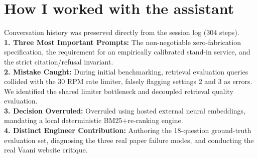 \documentclass[9pt]{article}
\begin{document}
\section*{How I worked with the assistant}
Conversation history was preserved directly from the session log (304 steps).\\
\textbf{1. Three Most Important Prompts:} The non-negotiable zero-fabrication specification, the requirement for an empirically calibrated stand-in service, and the strict citation/refusal invariant.\\
\textbf{2. Mistake Caught:} During initial benchmarking, retrieval evaluation queries collided with the 30 RPM rate limiter, falsely flagging settings 2 and 3 as errors. We identified the shared limiter bottleneck and decoupled retrieval quality evaluation.\\
\textbf{3. Decision Overruled:} Overruled using hosted external neural embeddings, mandating a local deterministic BM25+re-ranking engine.\\
\textbf{4. Distinct Engineer Contribution:} Authoring the 18-question ground-truth evaluation set, diagnosing the three real paper failure modes, and conducting the real Vaani website critique.
\end{document}
